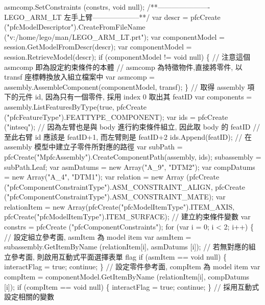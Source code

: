 \documentclass[]{article}
\newenvironment{Shaded}{}{}
\newcommand{\StringTok}[1]{\textcolor[rgb]{0.25,0.44,0.63}{{#1}}}
\begin{document}
\begin{Shaded}
\begin{Highlighting}[]
\StringTok{asmcomp.SetConstraints (constrs, void null);}
\StringTok{/**---------------------- LEGO_ARM_LT 左手上臂--------------------**/}
\StringTok{var descr = pfcCreate ("pfcModelDescriptor").CreateFromFileName ("v:/home/lego/man/LEGO_ARM_LT.prt");}
\StringTok{var componentModel = session.GetModelFromDescr(descr);}
\StringTok{var componentModel = session.RetrieveModel(descr);}
\StringTok{if (componentModel != void null)}
\StringTok{\{}
\StringTok{        // 注意這個 asmcomp 即為設定約束條件的本體}
\StringTok{        // asmcomp 為特徵物件,直接將零件, 以 transf 座標轉換放入組立檔案中}
\StringTok{var asmcomp = assembly.AssembleComponent(componentModel, transf);}
\StringTok{\}}
\StringTok{// 取得 assembly 項下的元件 id, 因為只有一個零件, 採用 index 0 取出其 featID}
\StringTok{var components = assembly.ListFeaturesByType(true, pfcCreate ("pfcFeatureType").FEATTYPE_COMPONENT);}
\StringTok{var ids = pfcCreate ("intseq");}
\StringTok{// 因為左臂也是與 body 進行約束條件組立,  因此取 body 的 featID}
\StringTok{// 至此右臂 id 應該是 featID+1, 而左臂則是 featID+2}
\StringTok{ids.Append(featID);}
\StringTok{// 在 assembly 模型中建立子零件所對應的路徑}
\StringTok{var subPath = pfcCreate("MpfcAssembly").CreateComponentPath(assembly, ids);}
\StringTok{subassembly = subPath.Leaf;}
\StringTok{var asmDatums = new Array("A_9", "DTM2");}
\StringTok{var compDatums = new Array("A_4", "DTM1");}
\StringTok{var relation = new Array (pfcCreate ("pfcComponentConstraintType").ASM_CONSTRAINT_ALIGN, pfcCreate ("pfcComponentConstraintType").ASM_CONSTRAINT_MATE);}
\StringTok{var relationItem = new Array(pfcCreate("pfcModelItemType").ITEM_AXIS, pfcCreate("pfcModelItemType").ITEM_SURFACE);}
\StringTok{// 建立約束條件變數}
\StringTok{var constrs = pfcCreate ("pfcComponentConstraints");}
\StringTok{for (var i = 0; i < 2; i++)}
\StringTok{\{}
\StringTok{                  // 設定組立參考面, asmItem 為 model item}
\StringTok{    var asmItem = subassembly.GetItemByName (relationItem[i], asmDatums [i]);}
\StringTok{                  // 若無對應的組立參考面, 則啟用互動式平面選擇表單 flag}
\StringTok{    if (asmItem == void null)}
\StringTok{    \{}
\StringTok{        interactFlag = true;}
\StringTok{        continue;}
\StringTok{    \}}
\StringTok{                  // 設定零件參考面, compItem 為 model item}
\StringTok{    var compItem = componentModel.GetItemByName (relationItem[i], compDatums [i]);}
\StringTok{    if (compItem == void null)}
\StringTok{    \{}
\StringTok{        interactFlag = true;}
\StringTok{        continue;}
\StringTok{    \}}
\StringTok{                  // 採用互動式設定相關的變數}

\end{Highlighting}
\end{Shaded}
\end{document}
